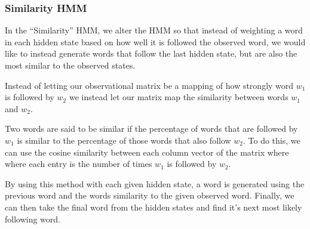 \documentclass{article}
\begin{document}
\pagebreak
\subsubsection{Similarity HMM}
In the ``Similarity'' HMM, we alter the HMM so that instead of weighting a word
in each hidden state based on how well it is followed the observed word, we
would like to instead generate words that follow the last hidden state, but are
also the most similar to the observed states.

Instead of letting our observational matrix be a mapping of how strongly word
$w_1$ is followed by $w_2$ we instead let our matrix map the similarity between
words $w_1$ and $w_2$.

Two words are said to be similar if the percentage of words that are followed
by $w_1$ is similar to the percentage of those words that also follow $w_2$. To
do this, we can use the cosine similarity between each column vector of the
matrix where where each entry is the number of times $w_1$ is followed
by $w_2$.

By using this method with each given hidden state, a word is generated using
the previous word and the words similarity to the given observed word.
Finally, we can then take the final word from the hidden states and find it's
next most likely following word.
\end{document}
